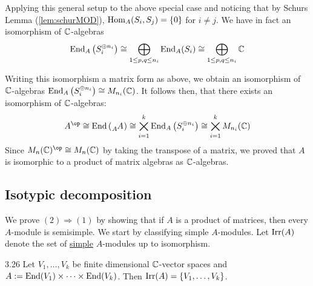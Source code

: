 \documentclass[twoside = false,	%
		headsepline,		%
		parskip = true,
		]{scrbook}						%
\begin{document}
        Applying this general setup to the above special case and noticing that by Schurs Lemma (\ref{lem:schurMOD}), $\mathrm{Hom}_A(S_i,S_j) = \{0\}$ for $i \neq j$. We have in fact an isomorphism of $\mathbb C$-algebras
        \begin{equation*}
            \mathrm{End}_A\left( S_i^{\oplus n_i}\right) \cong \bigoplus_{1 \leq p,q \leq n_i} \mathrm{End}_A(S_i) \cong \bigoplus_{1 \leq p,q \leq n_i} \mathbb C
        \end{equation*}

        Writing this isomorphism a matrix form as above, we obtain an isomorphism of $\mathbb C$-algebras $\mathrm{End}_A\left( S_i^{\oplus n_i}\right) \cong M_{n_i}(\mathbb C)$. It follows then, that there exists an isomorphism of $\mathbb C$-algebras:
        \begin{equation*}
        \begin{split}
            A^\op \cong \End\round{\tensor[_A]{A}{}} \cong \bigtimes_{i=1}^k \End_A\round{S_i^{\oplus n_i}} \cong \bigtimes_{i=1}^k M_{n_i}(\C)
        \end{split}
        \end{equation*}
        Since $M_n(\C)^\op \cong M_n(\C)$ by taking the transpose of a matrix, we proved that $A$ is isomorphic to a product of matrix algebras as $\mathbb C$-algebras.
        
    \subsection{Isotypic decomposition}
        We prove $(2)\Rightarrow(1)$ by showing that if $A$ is a product of matrices, then every $A$-module is semisimple. We start by classifying simple $A$-modules. Let $\mathrm{Irr}(A)$ denote the set of \underline{simple} $A$-modules up to isomorphism.

        \begin{proposition}{}{3.26}
            Let $V_1,\dots,V_k$ be finite dimensional $\mathbb C$-vector spaces and $A:=\mathrm{End}(V_1) \times \dots \times \mathrm{End}(V_k)$. Then $\mathrm{Irr}(A) = \{V_1,\dots,V_k\}$.
        \end{proposition}
\end{document}
